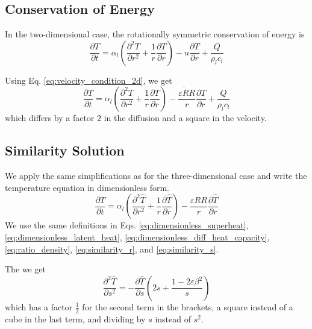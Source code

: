 \documentclass{article}
\numberwithin{equation}{section}
\newcommand{\pd}[2]{\dfrac{\partial #1}{\partial #2}}
\newcommand{\pdd}[2]{\dfrac{\partial^2 #1}{\partial #2^2}}
\newcommand{\dimless}[1]{\hat{#1}}
\begin{document}
\subsection{Conservation of Energy}

In the two-dimensional case, the rotationally symmetric conservation of energy is
\begin{equation}
    \pd{T}{t}
    =
    \alpha_l \left(
        \pdd{T}{r} +
        \frac1r \pd{T}{r}
    \right)
    - u \pd{T}{r}
    + \frac{Q}{\rho_l c_l}
\end{equation}

Using Eq. \eqref{eq:velocity_condition_2d}, we get
\begin{equation}
    \pd{T}{t}
    =
    \alpha_l \left(
        \pdd{T}{r} +
        \frac1r \pd{T}{r}
    \right)
    - \frac{\varepsilon \dot{R} R}{r} \pd{T}{r}
    + \frac{Q}{\rho_l c_l}
\end{equation}
which differs by a factor $2$ in the diffusion and a square in the velocity.

\subsection{Similarity Solution}

We apply the same simplifications as for the three-dimensional case and write the temperature equation in dimensionless form.
\begin{equation}
    \pd{\dimless{T}}{t} =
    \alpha_l \left(
        \pdd{\dimless{T}}{r} + \frac1r \pd{\dimless{T}}{r}
    \right)
    - \frac{\varepsilon \dot{R} R}{r} \pd{\dimless{T}}{r}
\end{equation}
We use the same definitions in Eqs.
\eqref{eq:dimensionless_superheat},
\eqref{eq:dimensionless_latent_heat},
\eqref{eq:dimensionless_diff_heat_capacity},
\eqref{eq:ratio_density},
\eqref{eq:similarity_r}, and
\eqref{eq:similarity_s}.

The we get
\begin{equation}
    \pdd{\dimless{T}}{s}
    =
    -\pd{\dimless{T}}{s} \left(
        2 s 
        + \frac{1 - 2 \varepsilon \beta^2}{s}
    \right)
\end{equation}
which has a factor $\frac12$ for the second term in the brackets, a square instead of a cube in the last term, and dividing by $s$ instead of $s^2$.
\end{document}
